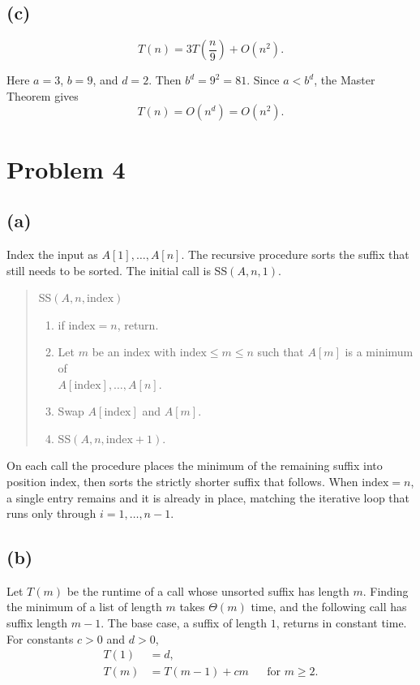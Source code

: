 \documentclass[11pt]{article}
\begin{document}
\subsection*{(c)}

\[
T(n)=3T\!\left(\frac{n}{9}\right)+O(n^{2}).
\]

Here $a=3$, $b=9$, and $d=2$. Then $b^{d}=9^{2}=81$. Since $a<b^{d}$, the Master Theorem gives
\[
T(n)=O(n^{d})=O(n^{2}).
\]

\section*{Problem 4}

\subsection*{(a)}

Index the input as $A[1],\ldots,A[n]$. The recursive procedure sorts the suffix that still needs to be sorted. The initial call is \textsc{SS}$(A,n,1)$.

\begin{quote}
\textsc{SS}$(A, n, \mathrm{index})$
\begin{enumerate}[leftmargin=1.6em, itemsep=0.35em, topsep=0.4em]
\item if $\mathrm{index}=n$, return.
\item Let $m$ be an index with $\mathrm{index}\le m\le n$ such that $A[m]$ is a minimum of\\
$A[\mathrm{index}],\ldots,A[n]$.
\item Swap $A[\mathrm{index}]$ and $A[m]$.
\item \textsc{SS}$(A, n, \mathrm{index}+1)$.
\end{enumerate}
\end{quote}

On each call the procedure places the minimum of the remaining suffix into position $\mathrm{index}$, then sorts the strictly shorter suffix that follows. When $\mathrm{index}=n$, a single entry remains and it is already in place, matching the iterative loop that runs only through $i=1,\ldots,n-1$.

\subsection*{(b)}

Let $T(m)$ be the runtime of a call whose unsorted suffix has length $m$. Finding the minimum of a list of length $m$ takes $\Theta(m)$ time, and the following call has suffix length $m-1$. The base case, a suffix of length $1$, returns in constant time. For constants $c>0$ and $d>0$,
\begin{align*}
T(1)&=d,\\
T(m)&=T(m-1)+cm &&\text{for }m\ge 2.
\end{align*}
\end{document}
